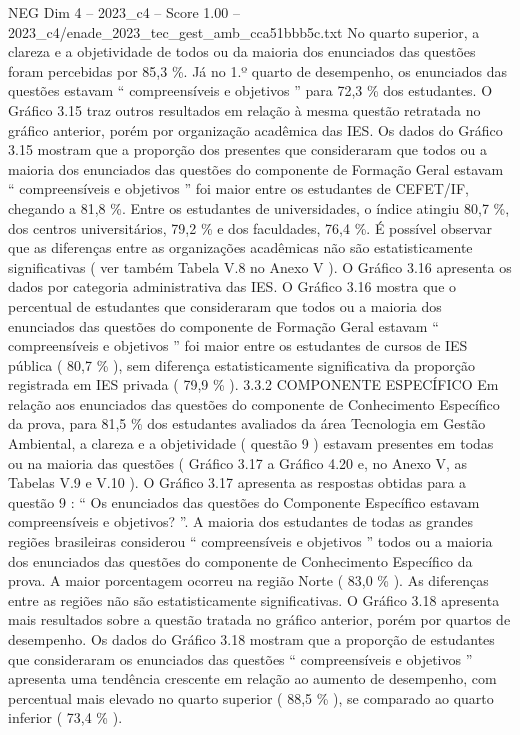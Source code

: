 \begin{textsample}{NEG Dim 4 – 2023\_c4 – Score 1.00 – 2023\_c4/enade\_2023\_tec\_gest\_amb\_cca51bbb5c.txt}
No quarto superior, a clareza e a objetividade de todos ou da maioria dos enunciados das questões foram percebidas por 85,3 \%.
Já no 1.º quarto de desempenho, os enunciados das questões estavam “ compreensíveis e objetivos ” para 72,3 \% dos estudantes.
O Gráfico 3.15 traz outros resultados em relação à mesma questão retratada no gráfico anterior, porém por organização acadêmica das IES.
Os dados do Gráfico 3.15 mostram que a proporção dos presentes que consideraram que todos ou a maioria dos enunciados das questões do componente de Formação Geral estavam “ compreensíveis e objetivos ” foi maior entre os estudantes de CEFET/IF, chegando a 81,8 \%.
Entre os estudantes de universidades, o índice atingiu 80,7 \%, dos centros universitários, 79,2 \% e dos faculdades, 76,4 \%.
É possível observar que as diferenças entre as organizações acadêmicas não são estatisticamente significativas ( ver também Tabela V.8 no Anexo V ).
O Gráfico 3.16 apresenta os dados por categoria administrativa das IES.
O Gráfico 3.16 mostra que o percentual de estudantes que consideraram que todos ou a maioria dos enunciados das questões do componente de Formação Geral estavam “ compreensíveis e objetivos ” foi maior entre os estudantes de cursos de IES pública ( 80,7 \% ), sem diferença estatisticamente significativa da proporção registrada em IES privada ( 79,9 \% ). 3.3.2 COMPONENTE ESPECÍFICO Em relação aos enunciados das questões do componente de Conhecimento Específico da prova, para 81,5 \% dos estudantes avaliados da área Tecnologia em Gestão Ambiental, a clareza e a objetividade ( questão 9 ) estavam presentes em todas ou na maioria das questões ( Gráfico 3.17 a Gráfico 4.20 e, no Anexo V, as Tabelas V.9 e V.10 ).
O Gráfico 3.17 apresenta as respostas obtidas para a questão 9 : “ Os enunciados das questões do Componente Específico estavam compreensíveis e objetivos? ”.
A maioria dos estudantes de todas as grandes regiões brasileiras considerou “ compreensíveis e objetivos ” todos ou a maioria dos enunciados das questões do componente de Conhecimento Específico da prova.
A maior porcentagem ocorreu na região Norte ( 83,0 \% ).
As diferenças entre as regiões não são estatisticamente significativas.
O Gráfico 3.18 apresenta mais resultados sobre a questão tratada no gráfico anterior, porém por quartos de desempenho.
Os dados do Gráfico 3.18 mostram que a proporção de estudantes que consideraram os enunciados das questões “ compreensíveis e objetivos ” apresenta uma tendência crescente em relação ao aumento de desempenho, com percentual mais elevado no quarto superior ( 88,5 \% ), se comparado ao quarto inferior ( 73,4 \% ).

\end{textsample}
